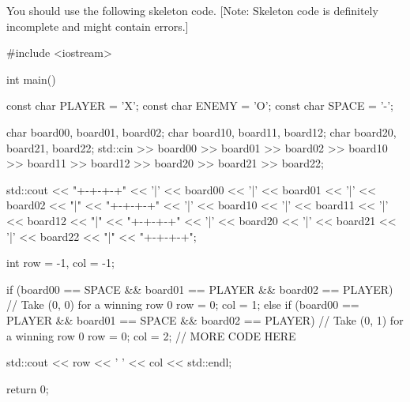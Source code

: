 You should use the following skeleton code.
[Note: Skeleton code is definitely incomplete and might
contain errors.]
{\footnotesize
\begin{console}
#include <iostream>

int main()
{
    const char PLAYER = 'X';
    const char ENEMY = 'O';
    const char SPACE = '-';

    char board00, board01, board02;
    char board10, board11, board12;
    char board20, board21, board22;
    std::cin >> board00 >> board01 >> board02
             >> board10 >> board11 >> board12
             >> board20 >> board21 >> board22;

    std::cout << "+-+-+-+\n"
              << '|' << board00 << '|' << board01 << '|' << board02 << "|\n"
              << "+-+-+-+\n"
              << '|' << board10 << '|' << board11 << '|' << board12 << "|\n"
              << "+-+-+-+\n"
              << '|' << board20 << '|' << board21 << '|' << board22 << "|\n"
              << "+-+-+-+\n";

    int row = -1, col = -1;

    if (board00 == SPACE && board01 == PLAYER && board02 == PLAYER)
    {
        // Take (0, 0) for a winning row 0
        row = 0;
        col = 1;
    }
    else
    {
        if (board00 == PLAYER && board01 == SPACE && board02 == PLAYER)
        {
            // Take (0, 1) for a winning row 0
            row = 0;
            col = 2;
        }
        // MORE CODE HERE
    }

    std::cout << row << ' ' << col << std::endl;

    return 0;
}
\end{console}
}

\newpage
